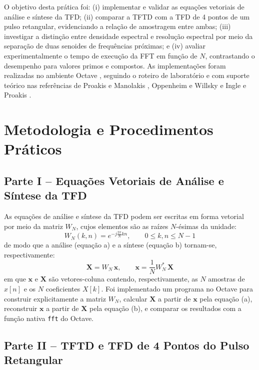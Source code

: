 \documentclass[tcc]{classe_uftex/uftex}
\begin{document}
O objetivo desta prática foi: (i) implementar e validar as equações vetoriais de análise e síntese da TFD; (ii) comparar a TFTD com a TFD de 4 pontos de um pulso retangular, evidenciando a relação de amostragem entre ambas; (iii) investigar a distinção entre densidade espectral e resolução espectral por meio da separação de duas senoides de frequências próximas; e (iv) avaliar experimentalmente o tempo de execução da FFT em função de $N$, contrastando o desempenho para valores primos e compostos. As implementações foram realizadas no ambiente Octave \cite{octaveman}, seguindo o roteiro de laboratório \cite{roteiro05} e com suporte teórico nas referências de Proakis e Manolakis \cite{proakis_manolakis}, Oppenheim e Willsky \cite{oppenheim_willsky} e Ingle e Proakis \cite{ingle2017}.

\chapter{Metodologia e Procedimentos Práticos}

\section{Parte I -- Equações Vetoriais de Análise e Síntese da TFD}

As equações de análise e síntese da TFD podem ser escritas em forma vetorial por meio da matriz $W_N$, cujos elementos são as raízes $N$-ésimas da unidade:
\begin{equation}
  W_N(k,n) = e^{-j\frac{2\pi}{N}kn}, \qquad 0 \leq k,n \leq N-1
  \label{eq:wn_def}
\end{equation}
de modo que a análise (equação a) e a síntese (equação b) tornam-se, respectivamente:
\begin{equation}
  \mathbf{X} = W_N\,\mathbf{x}, \qquad
  \mathbf{x} = \frac{1}{N}W_N^{*}\,\mathbf{X}
  \label{eq:dft_matricial}
\end{equation}
em que $\mathbf{x}$ e $\mathbf{X}$ são vetores-coluna contendo, respectivamente, as $N$ amostras de $x[n]$ e os $N$ coeficientes $X[k]$. Foi implementado um programa no Octave para construir explicitamente a matriz $W_N$, calcular $\mathbf{X}$ a partir de $\mathbf{x}$ pela equação (a), reconstruir $\mathbf{x}$ a partir de $\mathbf{X}$ pela equação (b), e comparar os resultados com a função nativa \texttt{fft} do Octave.

\section{Parte II -- TFTD e TFD de 4 Pontos do Pulso Retangular}
\end{document}
